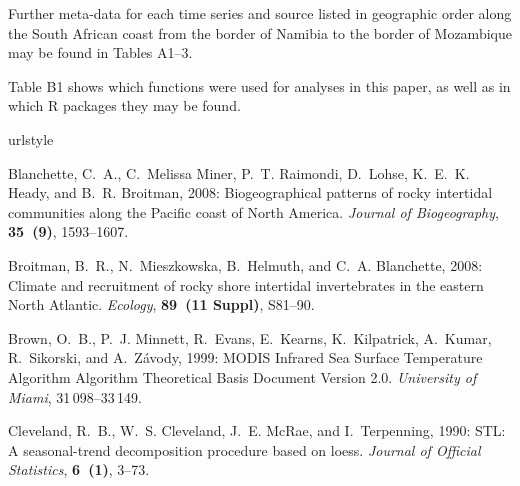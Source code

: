 \documentclass{ametsoc}
\begin{document}
%
\appendix[A]
Further meta-data for each time series and source listed in geographic order along the South African coast from the border of Namibia to the border of Mozambique may be found in Tables A1--3.

\appendix[B]
Table B1 shows which functions were used for analyses in this paper, as well as in which R packages they may be found.

%
\begin{thebibliography}{23}
\providecommand{\natexlab}[1]{#1}
\providecommand{\url}[1]{\texttt{#1}}
\renewcommand{\UrlFont}{\rmfamily}
\providecommand{\urlprefix}{URL }
\expandafter\ifx\csname urlstyle\endcsname\relax
  \providecommand{\doi}[1]{doi:\discretionary{}{}{}#1}\else
  \providecommand{\doi}{doi:\discretionary{}{}{}\begingroup
  \urlstyle{rm}\Url}\fi
\providecommand{\eprint}[2][]{\url{#2}}

Blanchette, C.~A., C.~{Melissa Miner}, P.~T. Raimondi, D.~Lohse, K.~E.~K.
  Heady, and B.~R. Broitman, 2008: {Biogeographical patterns of rocky
  intertidal communities along the Pacific coast of North America}.
  \textit{Journal of Biogeography}, \textbf{35~(9)}, 1593--1607.

Broitman, B.~R., N.~Mieszkowska, B.~Helmuth, and C.~A. Blanchette, 2008:
  {Climate and recruitment of rocky shore intertidal invertebrates in the
  eastern North Atlantic.} \textit{Ecology}, \textbf{89~(11 Suppl)}, S81--90.

Brown, O.~B., P.~J. Minnett, R.~Evans, E.~Kearns, K.~Kilpatrick, A.~Kumar,
  R.~Sikorski, and A.~Z{\'{a}}vody, 1999: {MODIS Infrared Sea Surface
  Temperature Algorithm Algorithm Theoretical Basis Document Version 2.0}.
  \textit{University of Miami}, 31\,098--33\,149.

Cleveland, R.~B., W.~S. Cleveland, J.~E. McRae, and I.~Terpenning, 1990: {STL:
  A seasonal-trend decomposition procedure based on loess}. \textit{Journal of
  Official Statistics}, \textbf{6~(1)}, 3--73.


\end{thebibliography}
\end{document}
